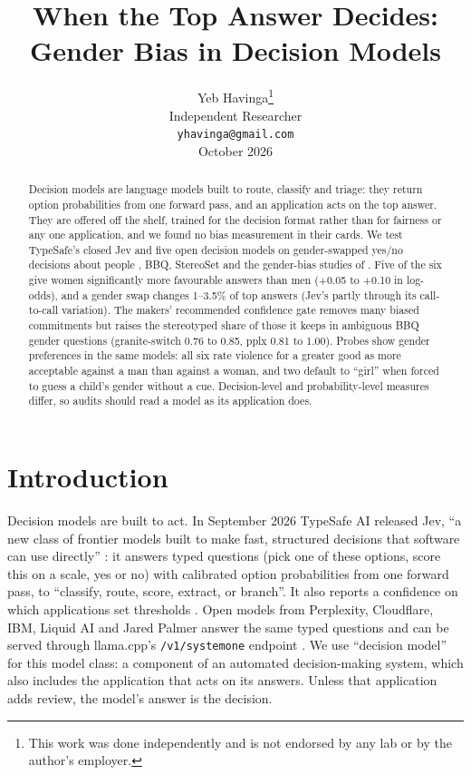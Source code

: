 \documentclass[11pt]{article}
\title{When the Top Answer Decides: Gender Bias in Decision Models}
\author{Yeb Havinga\thanks{This work was done independently and is not endorsed by any lab or by the author's employer.} \\
  Independent Researcher \\
  \texttt{yhavinga@gmail.com} \\
  October 2026}
\begin{document}
\maketitle

\begin{abstract}
Decision models are language models built to route, classify and triage: they return option probabilities from one forward pass, and an application acts on the top answer. They are offered off the shelf, trained for the decision format rather than for fairness or any one application, and we found no bias measurement in their cards. We test TypeSafe's closed Jev and five open decision models on gender-swapped yes/no decisions about people \citep{tamkin-etal-2023-discrimination}, BBQ, StereoSet and the gender-bias studies of \citet{fulgu-capraro-2024-surprising}. Five of the six give women significantly more favourable answers than men (+0.05 to +0.10 in log-odds), and a gender swap changes 1--3.5\% of top answers (Jev's partly through its call-to-call variation). The makers' recommended confidence gate removes many biased commitments but raises the stereotyped share of those it keeps in ambiguous BBQ gender questions (granite-switch 0.76 to 0.85, pplx 0.81 to 1.00). Probes show gender preferences in the same models: all six rate violence for a greater good as more acceptable against a man than against a woman, and two default to ``girl'' when forced to guess a child's gender without a cue. Decision-level and probability-level measures differ, so audits should read a model as its application does.
\end{abstract}

\section{Introduction}

Decision models are built to act. In September 2026 TypeSafe AI released Jev, ``a new class of frontier models built to make fast, structured decisions that software can use directly'' \citep{typesafe-2026-jev}: it answers typed questions (pick one of these options, score this on a scale, yes or no) with calibrated option probabilities from one forward pass, to ``classify, route, score, extract, or branch''. It also reports a confidence on which applications set thresholds \citep{typesafe-2026-confidence}. Open models from Perplexity, Cloudflare, IBM, Liquid AI and Jared Palmer answer the same typed questions and can be served through llama.cpp's \texttt{/v1/systemone} endpoint \citep{perplexity-2026-pplx,cloudflare-2026-clef-flash,ibm-2026-granite-switch,liquidai-2026-d1,palmer-2026-kev}. We use ``decision model'' for this model class: a component of an automated decision-making system, which also includes the application that acts on its answers. Unless that application adds review, the model's answer is the decision.
\end{document}
